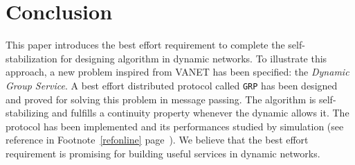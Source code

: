 \documentclass[11pt,english]{article}
\begin{document}
\section{Conclusion}
\label{s:conclu}



This paper introduces the best effort requirement to complete the
self-stabilization for designing algorithm in dynamic networks.
To illustrate this approach, a new problem inspired from VANET has been
specified: the \emph{Dynamic Group Service}.  A best effort distributed protocol
called \texttt{GRP} has been designed and proved for solving this problem in
message passing. The algorithm is self-stabilizing and fulfills a continuity
property whenever the dynamic allows it.
The protocol has been implemented and its performances studied by simulation
(see reference in Footnote~\ref{refonline} page~\pageref{refonline}). We believe
that the best effort requirement is promising for building useful services in
dynamic networks.
\end{document}

